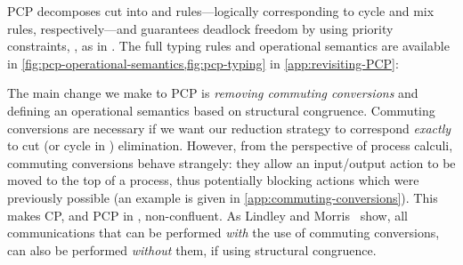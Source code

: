 \documentclass[main.tex]{subfiles}
\begin{document}
PCP decomposes cut into  and  rules---logically corresponding to cycle and mix rules, respectively---and guarantees deadlock freedom by using priority constraints, \eg, as in . The full typing rules and operational semantics are available in \cref{fig:pcp-operational-semantics,fig:pcp-typing} in \cref{app:revisiting-PCP}:
\begin{mathpar}
  \small
\end{mathpar}

The main change we make to PCP is \emph{removing commuting conversions} and defining an operational semantics based on structural congruence. Commuting conversions are necessary if we want our reduction strategy to correspond \emph{exactly} to cut (or cycle in \cite{dardhagay18}) elimination. 
However, from the perspective of process calculi, commuting conversions behave strangely: they allow an input/output action to be moved to the top of a process, thus potentially blocking actions which were previously possible (an example is given in \cref{app:commuting-conversions}). This makes CP, and PCP in \cite{dardhagay18}, non-confluent.
As Lindley and Morris~\cite{lindleymorris15} show, all communications that can be performed \emph{with} the use of commuting conversions, can also be performed \emph{without} them, if using structural congruence.
%
\end{document}
